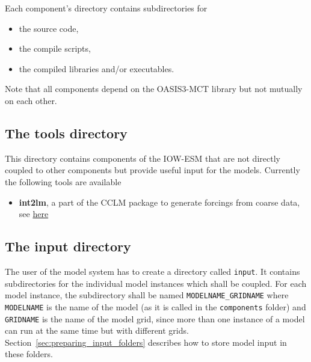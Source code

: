 \documentclass[a4paper,titlepage]{scrartcl}
\begin{document}
Each component's directory contains subdirectories for
\begin{itemize}
\item the source code,
\item the compile scripts,
\item the compiled libraries and/or executables.
\end{itemize}

Note that all components depend on the OASIS3-MCT library but not mutually on each other.

\subsection{The tools directory}
This directory contains components of the IOW-ESM that are not directly coupled to other components but provide useful input for the models.
Currently the following tools are available
\begin{itemize}
\item \textbf{int2lm}, a part of the CCLM package to generate forcings from coarse data, see \href{https://wiki.coast.hereon.de/clmcom/}{here}
\end{itemize}
 

\subsection{The input directory}
The user of the model system has to create a directory called \texttt{input}.
It contains subdirectories for the individual model instances which shall be coupled.
For each model instance, the subdirectory shall be named \texttt{\color{red}MODELNAME\color{black}\_\color{red}GRIDNAME} where \texttt{\color{red}MODELNAME} is the name of the model (as it is called in the \texttt{components} folder) and \texttt{\color{red}GRIDNAME} is the name of the model grid, since more than one instance of a model can run at the same time but with different grids.
Section~\ref{sec:preparing_input_folders} describes how to store model input in these folders.
\end{document}
